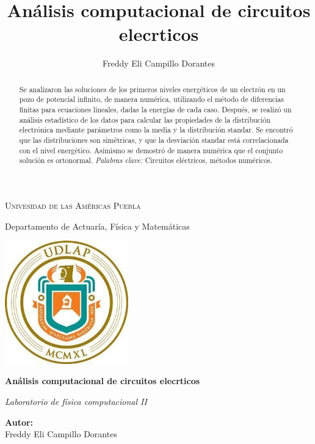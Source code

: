 \documentclass[12pt,twoside]{extarticle}
\title{\bfseries\huge \sffamily Análisis computacional de circuitos elecrticos}
\author{\normalfont Freddy Eli Campillo Dorantes}
\date{\itshape\LARGE\bfseries}
\begin{document}
\begin{titlepage}
\centering
{\huge\scshape Univesidad de las Américas Puebla \par}
\vspace{0.5cm}
{\Large Departamento de Actuaría, Física y Matemáticas \par}
\vspace{2cm}
{\includegraphics[width=0.4\textwidth]{figures/EscudoUDLAP.jpg}\par}
\vspace{2cm}
{\sffamily\Huge\bfseries Análisis computacional de circuitos elecrticos\par}
\vspace{1cm}
    {\large\itshape Laboratorio de física computacional II\par}
\vfill
{\textbf{Autor:}\\
 Freddy Eli Campillo Dorantes\par}
\end{titlepage}
\tableofcontents
\maketitle

\begin{tcolorbox}[colback=black!10!white,colframe=black,enhanced,sharp corners,boxrule=0.6pt]
\begin{abstract}
Se analizaron las soluciones de los primeros niveles energéticos de un electrón en un pozo de potencial infinito, de manera numérica, utilizando el método de diferencias finitas para ecuaciones lineales, dadas la energías de cada caso. Después, se realizó un análisis estadístico de los datos para calcular las propiedades de la distribución electrónica mediante parámetros como la media y la distribución standar.
Se encontró que las distribuciones son simétricas, y que la desviación standar está correlacionada con el nivel energético. Asímismo se demostró de manera numérica que el conjunto solución es ortonormal.
 \noindent\textit{ Palabras clave:} Circuitos eléctricos, métodos numéricos.
 \end{abstract}
\end{tcolorbox}
\setlength{\parskip}{0.4\baselineskip}\newpage
\end{document}
